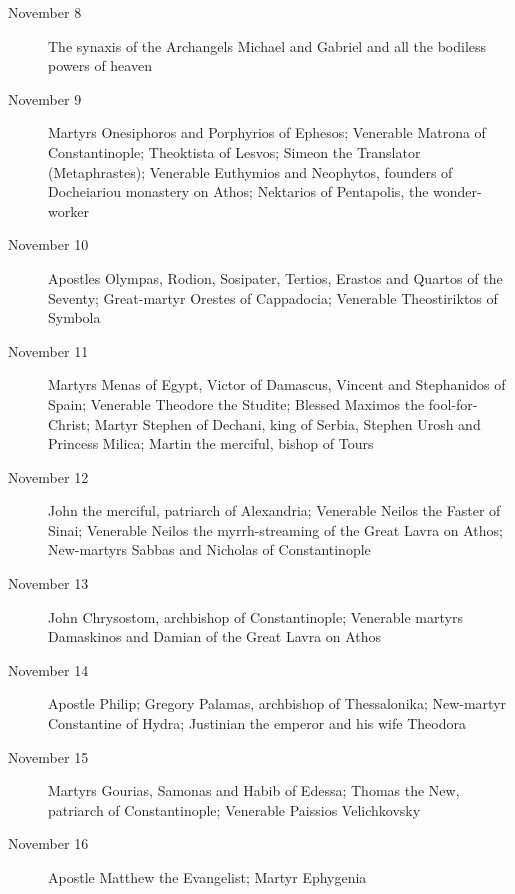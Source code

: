 \begin{description}
\item[November 8]

The synaxis of the Archangels Michael and Gabriel and all the bodiless powers of heaven

\item[November 9]

Martyrs Onesiphoros and Porphyrios of Ephesos; Venerable Matrona of Constantinople; Theoktista of Lesvos; Simeon the Translator (Metaphrastes); Venerable Euthymios and Neophytos, founders of Docheiariou monastery on Athos; Nektarios of Pentapolis, the wonder-worker

\item[November 10]

Apostles Olympas, Rodion, Sosipater, Tertios, Erastos and Quartos of the Seventy; Great-martyr Orestes of Cappadocia; Venerable Theostiriktos of Symbola

\item[November 11]

Martyrs Menas of Egypt, Victor of Damascus, Vincent and Stephanidos of Spain; Venerable Theodore the Studite; Blessed Maximos the fool-for-Christ; Martyr Stephen of Dechani, king of Serbia, Stephen Urosh and Princess Milica; Martin the merciful, bishop of Tours

\item[November 12]

John the merciful, patriarch of Alexandria; Venerable Neilos the Faster of Sinai; Venerable Neilos the myrrh-streaming of the Great Lavra on Athos; New-martyrs Sabbas and Nicholas of Constantinople

\item[November 13]

John Chrysostom, archbishop of Constantinople; Venerable martyrs Damaskinos and Damian of the Great Lavra on Athos

\item[November 14]

Apostle Philip; Gregory Palamas, archbishop of Thessalonika; New-martyr Constantine of Hydra; Justinian the emperor and his wife Theodora

\item[November 15]

Martyrs Gourias, Samonas and Habib of Edessa; Thomas the New, patriarch of Constantinople; Venerable Paissios Velichkovsky

\item[November 16]

Apostle Matthew the Evangelist; Martyr Ephygenia


\end{description}
